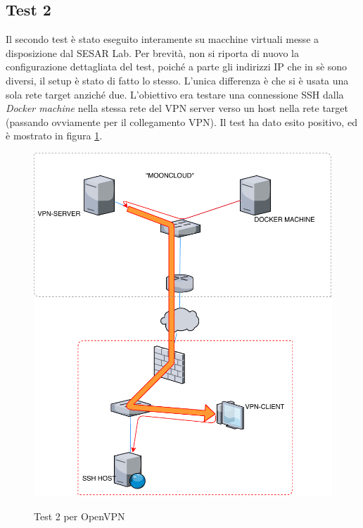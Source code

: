 \subsection{Test 2}
Il secondo test è stato eseguito interamente su macchine virtuali messe
a disposizione dal SESAR Lab. Per brevità, non si riporta di nuovo la
configurazione dettagliata del test, poiché a parte gli indirizzi IP
che in sè sono diversi, il setup è stato di fatto lo stesso. L'unica
differenza è che si è usata una sola rete target anziché due.
L'obiettivo era testare una connessione SSH dalla \textit{Docker machine}
nella stessa rete del VPN server verso un host nella rete target (passando
ovviamente per il collegamento VPN).
Il test ha dato esito positivo, ed è mostrato in figura \ref{fig:openvpn-test2}.
\begin{figure}
  \includegraphics[scale=0.55]{img/openvpn_test2}
  \label{fig:openvpn-test2}
  \caption{Test 2 per OpenVPN}
\end{figure}